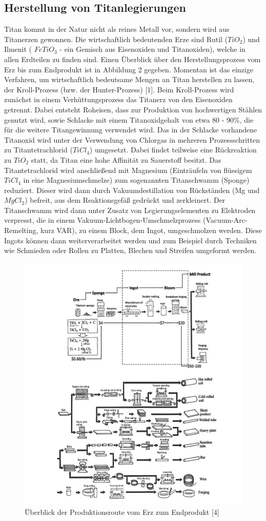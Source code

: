 \subsection{Herstellung von Titanlegierungen}
Titan kommt in der Natur nicht als reines Metall vor, sondern wird aus Titanerzen gewonnen. Die wirtschaftlich bedeutenden Erze sind Rutil ($TiO_2$) und Ilmenit ( $FeTiO_3$ - ein Gemisch aus Eisenoxiden und Titanoxiden), welche in allen Erdteilen zu finden sind. Einen Überblick über den Herstellungsprozess vom Erz bis zum Endprodukt ist in Abbildung 2 gegeben. Momentan ist das einzige Verfahren, um wirtschaftlich bedeutsame Mengen an Titan herstellen zu lassen, der Kroll-Prozess (bzw. der Hunter-Prozess) [1]. Beim Kroll-Prozess wird zunächst in einem Verhüttungsprozess das Titanerz von den Eisenoxiden getrennt. Dabei entsteht Roheisen, dass zur Produktion von hochwertigen Stählen genutzt wird, 
sowie Schlacke mit einem Titanoxidgehalt von etwa 80 - 90\%, die für die weitere Titangewinnung verwendet wird. Das in der Schlacke vorhandene Titanoxid wird unter der Verwendung von Chlorgas in mehreren Prozessschritten zu Titantetrachlorid ($TiCl_4$) umgesetzt. Dabei findet teilweise eine Rückreaktion zu $TiO_2$ statt, da Titan eine hohe Affinität zu Sauerstoff besitzt. Das Titantetrachlorid wird anschließend mit Magnesium (Einträufeln von flüssigem $TiCl_4$ in eine Magnesiumschmelze) zum sogenannten Titanschwamm (Sponge) reduziert. Dieser wird dann durch Vakuumdestillation von Rückständen (Mg und $MgCl_2$) befreit, aus dem Reaktionsgefäß gedrückt und zerkleinert. Der Titanschwamm wird dann unter Zusatz von Legierungselementen zu Elektroden verpresst, die in einem Vakuum-Lichtbogen-Umschmelzprozess (Vacuum-Arc-Remelting, kurz VAR), zu einem Block, dem Ingot, umgeschmolzen werden. Diese Ingots können dann weiterverarbeitet werden und zum Beispiel durch Techniken wie Schmieden oder Rollen zu Platten, Blechen und Streifen umgeformt werden. 

\begin{figure}[h]
	\centering
	\includegraphics[width=0.7\linewidth]{"Bilder/Abbildung 2"}
	\caption[Abbildung 2]{Überblick der Produktionsroute vom Erz zum Endprodukt [4]}
	\label{fig:abbildung-2}
\end{figure}

